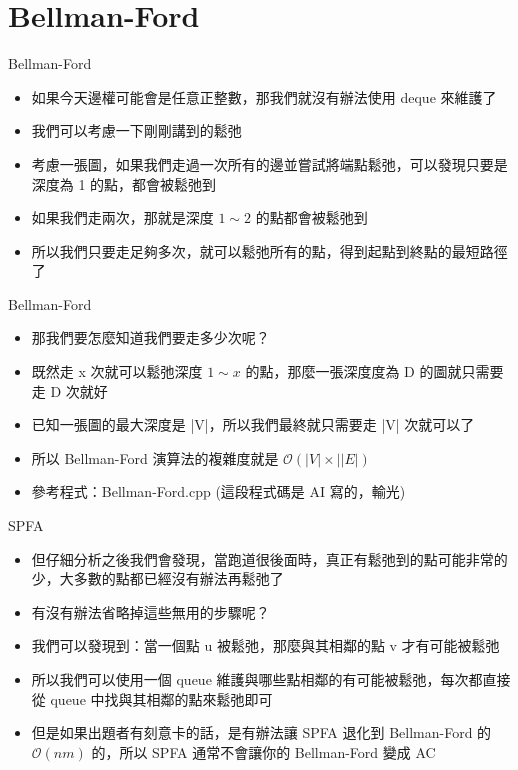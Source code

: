 \documentclass[aspectratio=169]{beamer}
\begin{document}
    \section{Bellman-Ford}

    \begin{frame}{Bellman-Ford}
        \begin{itemize}
            \item<1-> 如果今天邊權可能會是任意正整數，那我們就沒有辦法使用 deque 來維護了
            \item<2-> 我們可以考慮一下剛剛講到的鬆弛
            \item<3-> 考慮一張圖，如果我們走過一次所有的邊並嘗試將端點鬆弛，可以發現只要是深度為 1 的點，都會被鬆弛到
            \item<4-> 如果我們走兩次，那就是深度 $1 \sim 2$ 的點都會被鬆弛到
            \item<5-> 所以我們只要走足夠多次，就可以鬆弛所有的點，得到起點到終點的最短路徑了
        \end{itemize}
    \end{frame}

    \begin{frame}{Bellman-Ford}
        \begin{itemize}
            \item<1-> 那我們要怎麼知道我們要走多少次呢？
            \item<2-> 既然走 x 次就可以鬆弛深度 $1 \sim x$ 的點，那麼一張深度度為 D 的圖就只需要走 D 次就好
            \item<3-> 已知一張圖的最大深度是 |V|，所以我們最終就只需要走 |V| 次就可以了
            \item<4-> 所以 Bellman-Ford 演算法的複雜度就是 $\mathcal{O}(\lvert V \rvert \times \lvert \mid E \rvert)$
            \item<5-> 參考程式：Bellman-Ford.cpp (這段程式碼是 AI 寫的，輸光)
        \end{itemize}
    \end{frame}

    \begin{frame}{SPFA}
        \begin{itemize}
            \item<1-> 但仔細分析之後我們會發現，當跑道很後面時，真正有鬆弛到的點可能非常的少，大多數的點都已經沒有辦法再鬆弛了
            \item<2-> 有沒有辦法省略掉這些無用的步驟呢？
            \item<3-> 我們可以發現到：當一個點 u 被鬆弛，那麼與其相鄰的點 v 才有可能被鬆弛
            \item<4-> 所以我們可以使用一個 queue 維護與哪些點相鄰的有可能被鬆弛，每次都直接從 queue 中找與其相鄰的點來鬆弛即可
            \item<5-> 但是如果出題者有刻意卡的話，是有辦法讓 SPFA 退化到 Bellman-Ford 的 $\mathcal{O}(nm)$ 的，所以 SPFA 通常不會讓你的 Bellman-Ford 變成 AC
        \end{itemize}
    \end{frame}
\end{document}
